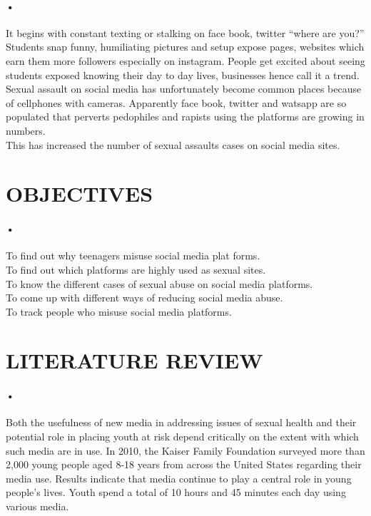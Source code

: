\documentclass[12pt]{article}
\begin{document}
\paragraph{•}
It begins with constant texting or stalking on face book, twitter “where are you?”
Students snap funny, humiliating pictures and setup expose pages, websites which earn them more followers especially on instagram. People get excited about seeing students exposed knowing their day to day lives, businesses hence call it a trend.\\
Sexual assault on social media has unfortunately become common places because of cellphones with cameras. Apparently face book, twitter and watsapp are so populated that perverts pedophiles and rapists using the platforms are growing in numbers.\\
This has increased the number of sexual assaults cases on social media sites.

  
\section{OBJECTIVES}
\paragraph{•}
To find out why teenagers misuse social media plat forms.\\
To find out which platforms are highly used as sexual sites.\\
To know the different cases of sexual abuse on social media platforms.\\
To come up with different ways of reducing social media abuse.\\
To track people who misuse social media platforms. 

\section{LITERATURE REVIEW}
\paragraph{•}
Both the usefulness of new media in addressing issues of sexual health and their potential role in placing youth at risk depend critically on the extent with which such media are in use. In 2010, the Kaiser Family Foundation surveyed more than 2,000 young people aged 8-18 years from across the United States regarding their media use. Results indicate that media continue to play a central role in young people's lives. Youth spend a total of 10 hours and 45 minutes each day using various media.
\end{document}
